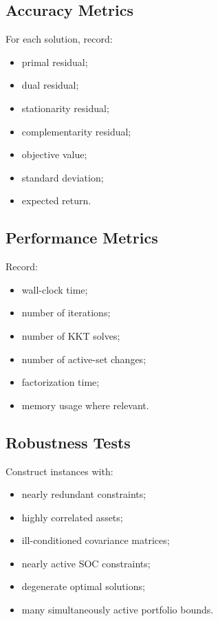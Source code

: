 \documentclass[11pt,a4paper]{article}
\begin{document}
\subsection{Accuracy Metrics}

For each solution, record:

\begin{itemize}
    \item primal residual;
    \item dual residual;
    \item stationarity residual;
    \item complementarity residual;
    \item objective value;
    \item standard deviation;
    \item expected return.
\end{itemize}

\subsection{Performance Metrics}

Record:

\begin{itemize}
    \item wall-clock time;
    \item number of iterations;
    \item number of KKT solves;
    \item number of active-set changes;
    \item factorization time;
    \item memory usage where relevant.
\end{itemize}

\subsection{Robustness Tests}

Construct instances with:

\begin{itemize}
    \item nearly redundant constraints;
    \item highly correlated assets;
    \item ill-conditioned covariance matrices;
    \item nearly active SOC constraints;
    \item degenerate optimal solutions;
    \item many simultaneously active portfolio bounds.
\end{itemize}
\end{document}
